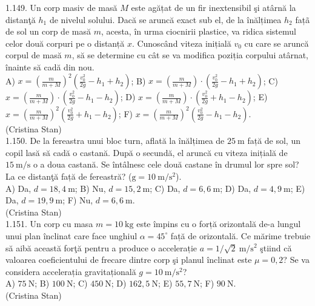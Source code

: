 1.149. Un corp masiv de masă $M$ este agățat de un fir inextensibil şi atârnă la distanţă $h_{1}$ de nivelul solului. Dacă se aruncă exact sub el, de la înălțimea $h_{2}$ fațã de sol un corp de masă $m$, acesta, în urma ciocnirii plastice, va ridica sistemul celor două corpuri pe o distanță $x$. Cunoscând viteza inițială $v_{0}$ cu care se aruncă corpul de masă $m$, să se determine cu cât se va modifica poziția corpului atârnat, înainte să cadă din nou.\\ A) $x=\left(\frac{m}{m+M}\right)^{2}\left(\frac{v_{0}^{2}}{2 g}-h_{1}+h_{2}\right)$; B) $x=\left(\frac{m}{m+M}\right) \cdot\left(\frac{v_{0}^{2}}{2 g}-h_{1}+h_{2}\right)$; C) $x=\left(\frac{m}{m+M}\right) \cdot\left(\frac{v_{0}^{2}}{2 g}-h_{1}-h_{2}\right)$; D) $x=\left(\frac{m}{m+M}\right) \cdot\left(\frac{v_{0}^{2}}{2 g}+h_{1}-h_{2}\right)$; E) $x=\left(\frac{m}{m+M}\right)^{2}\left(\frac{v_{0}^{2}}{2 g}+h_{1}-h_{2}\right)$; F) $x=\left(\frac{m}{m+M}\right)^{2}\left(\frac{v_{0}^{2}}{2 g}-h_{1}-h_{2}\right)$.\\ (Cristina Stan)\\

1.150. De la fereastra unui bloc turn, aflată la înălțimea de $25 \mathrm{~m}$ față de sol, un copil lasă să cadă o castană. După o secundă, el aruncă cu viteza inițială de $15 \mathrm{~m} / \mathrm{s}$ o a doua castană. Se întâlnesc cele două castane în drumul lor spre sol? La ce distanţă față de fereastră? ($\mathrm{g}=10 \mathrm{~m} / \mathrm{s}^{2}$).\\ A) Da, $d=18,4 \mathrm{~m}$; B) Nu, $d=15,2 \mathrm{~m}$; C) Da, $d=6,6 \mathrm{~m}$; D) Da, $d=4,9 \mathrm{~m}$; E) Da, $d=19,9 \mathrm{~m}$; F) Nu, $d=6,6 \mathrm{~m}$.\\ (Cristina Stan)\\

1.151. Un corp cu masa $m=10 \mathrm{~kg}$ este împins cu o forță orizontală de-a lungul unui plan înclinat care face unghiul $\alpha=45^{\circ}$ față de orizontală. Ce mărime trebuie să aibă această forţă pentru a produce o accelerație $a=1 / \sqrt{2} \mathrm{~m} / \mathrm{s}^{2}$ ştiind că valoarea coeficientului de frecare dintre corp şi planul înclinat este $\mu=0,2$? Se va considera accelerația gravitațională $g=10 \mathrm{~m} / \mathrm{s}^{2}$?\\ A) $75 \mathrm{~N}$; B) $100 \mathrm{~N}$; C) $450 \mathrm{~N}$; D) $162,5 \mathrm{~N}$; E) $55,7 \mathrm{~N}$; F) $90 \mathrm{~N}$.\\ (Cristina Stan)\\

